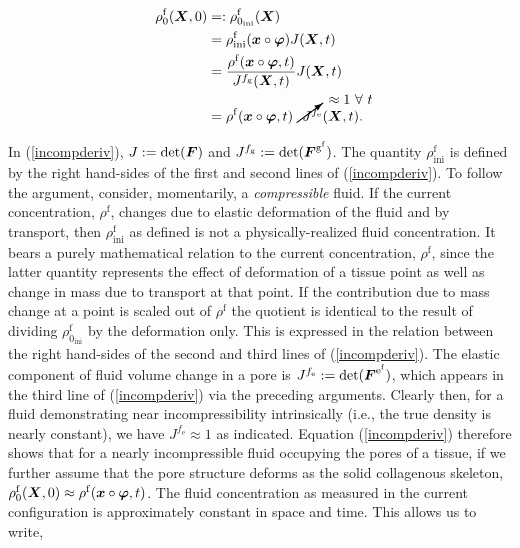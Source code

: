\begin{equation}
\begin{split}
\rho_{0}^{\mathrm{f}}(\bX,0)
                   &=:\rho_{0_{\mathrm{ini}}}^{\mathrm{f}}(\bX)\\ 
                   &=\rho_{\mathrm{ini}}^{\mathrm{f}}(\bx\circ\Bvarphi)
                   J(\bX, t)\\ &=\frac{\rho^{\mathrm{f}}
                   (\bx\circ\Bvarphi,t)} {J^{f_\mathrm{g}}(\bX,t)}
                   J(\bX,t)\\ &=\rho^{\mathrm{f}} (\bx\circ\Bvarphi,t)
                   \cancelto{\approx 1\ \forall\ t}
                   {J^{f_\mathrm{e}}}(\bX,t).\\
\label{incompderiv}
\end{split}
\end{equation}

In (\ref{incompderiv}), $J := \mathrm{det}(\mbox{\boldmath$ F$})$ and $J^{f_\mathrm{g}} :=
\mathrm{det}(\mbox{\boldmath$ F$}^{\mathrm{g}^{\mathrm{f}}})$. The quantity
$\rho_{\mathrm{ini}}^{\mathrm{f}}$ is defined by the right hand-sides
of the first and second lines of (\ref{incompderiv}). To follow the
argument, consider, momentarily, a \emph{compressible} fluid. If the
current concentration, $\rho^\mathrm{f}$, changes due to elastic
deformation of the fluid and by transport, then
$\rho_{\mathrm{ini}}^{\mathrm{f}}$ as defined is not a
physically-realized fluid concentration. It bears a purely
mathematical relation to the current concentration, $\rho^\mathrm{f}$,
since the latter quantity represents the effect of deformation of a
tissue point as well as change in mass due to transport at that
point. If the contribution due to mass change at a point is scaled
out of $\rho^\mathrm{f}$ the quotient is identical to the result of
dividing $\rho_{0_{\mathrm{ini}}}^{\mathrm{f}}$ by the deformation
only. This is expressed in the relation between the right hand-sides
of the second and third lines of (\ref{incompderiv}). The elastic
component of fluid volume change in a pore is $J^{f_\mathrm{e}} :=
\mathrm{det}(\mbox{\boldmath$ F$}^{\mathrm{e}^{\mathrm{f}}})$, which appears  in the third
line of (\ref{incompderiv}) via the preceding arguments. Clearly then,
for a fluid demonstrating near incompressibility intrinsically (i.e.,
the true density is nearly constant), we have $J^{f_\mathrm{e}}
\approx 1$ as indicated. Equation (\ref{incompderiv}) therefore shows
that for a nearly incompressible fluid occupying the pores of a
tissue, if we further assume that the pore structure deforms as the
solid collagenous skeleton, $\rho_0^\mathrm{f}(\mbox{\boldmath$ X$},0) \approx
\rho^\mathrm{f}(\mbox{\boldmath$ x$}\circ\mbox{\boldmath$\varphi$},t)$. The fluid concentration as
measured in the current configuration is approximately constant in
space and time. This allows us to write,


